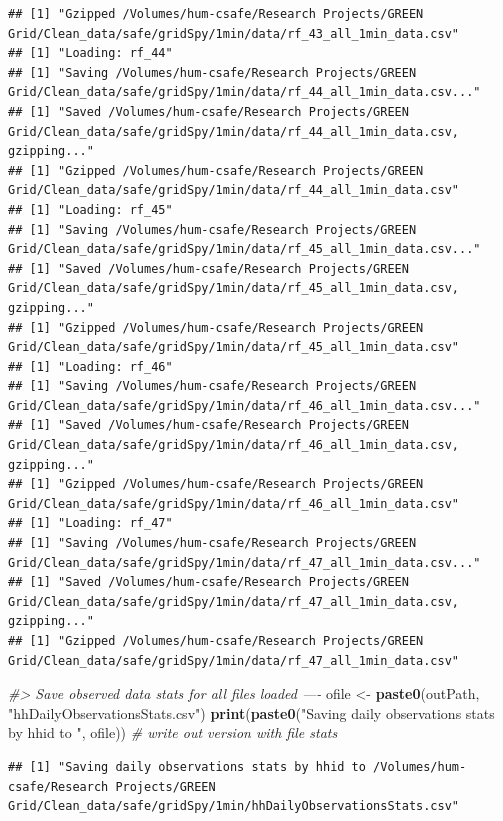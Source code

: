 \documentclass[]{article}
\newenvironment{Shaded}{\begin{snugshade}}{\end{snugshade}}
\newcommand{\KeywordTok}[1]{\textcolor[rgb]{0.13,0.29,0.53}{\textbf{#1}}}
\newcommand{\StringTok}[1]{\textcolor[rgb]{0.31,0.60,0.02}{#1}}
\newcommand{\CommentTok}[1]{\textcolor[rgb]{0.56,0.35,0.01}{\textit{#1}}}
\newcommand{\NormalTok}[1]{#1}
\begin{document}
\begin{verbatim}
## [1] "Gzipped /Volumes/hum-csafe/Research Projects/GREEN Grid/Clean_data/safe/gridSpy/1min/data/rf_43_all_1min_data.csv"
## [1] "Loading: rf_44"
## [1] "Saving /Volumes/hum-csafe/Research Projects/GREEN Grid/Clean_data/safe/gridSpy/1min/data/rf_44_all_1min_data.csv..."
## [1] "Saved /Volumes/hum-csafe/Research Projects/GREEN Grid/Clean_data/safe/gridSpy/1min/data/rf_44_all_1min_data.csv, gzipping..."
## [1] "Gzipped /Volumes/hum-csafe/Research Projects/GREEN Grid/Clean_data/safe/gridSpy/1min/data/rf_44_all_1min_data.csv"
## [1] "Loading: rf_45"
## [1] "Saving /Volumes/hum-csafe/Research Projects/GREEN Grid/Clean_data/safe/gridSpy/1min/data/rf_45_all_1min_data.csv..."
## [1] "Saved /Volumes/hum-csafe/Research Projects/GREEN Grid/Clean_data/safe/gridSpy/1min/data/rf_45_all_1min_data.csv, gzipping..."
## [1] "Gzipped /Volumes/hum-csafe/Research Projects/GREEN Grid/Clean_data/safe/gridSpy/1min/data/rf_45_all_1min_data.csv"
## [1] "Loading: rf_46"
## [1] "Saving /Volumes/hum-csafe/Research Projects/GREEN Grid/Clean_data/safe/gridSpy/1min/data/rf_46_all_1min_data.csv..."
## [1] "Saved /Volumes/hum-csafe/Research Projects/GREEN Grid/Clean_data/safe/gridSpy/1min/data/rf_46_all_1min_data.csv, gzipping..."
## [1] "Gzipped /Volumes/hum-csafe/Research Projects/GREEN Grid/Clean_data/safe/gridSpy/1min/data/rf_46_all_1min_data.csv"
## [1] "Loading: rf_47"
## [1] "Saving /Volumes/hum-csafe/Research Projects/GREEN Grid/Clean_data/safe/gridSpy/1min/data/rf_47_all_1min_data.csv..."
## [1] "Saved /Volumes/hum-csafe/Research Projects/GREEN Grid/Clean_data/safe/gridSpy/1min/data/rf_47_all_1min_data.csv, gzipping..."
## [1] "Gzipped /Volumes/hum-csafe/Research Projects/GREEN Grid/Clean_data/safe/gridSpy/1min/data/rf_47_all_1min_data.csv"
\end{verbatim}

\begin{Shaded}
\begin{Highlighting}[]
\CommentTok{#> Save observed data stats for all files loaded ----}
\NormalTok{ofile <-}\StringTok{ }\KeywordTok{paste0}\NormalTok{(outPath, }\StringTok{"hhDailyObservationsStats.csv"}\NormalTok{)}
\KeywordTok{print}\NormalTok{(}\KeywordTok{paste0}\NormalTok{(}\StringTok{"Saving daily observations stats by hhid to "}\NormalTok{, ofile)) }\CommentTok{# write out version with file stats}
\end{Highlighting}
\end{Shaded}

\begin{verbatim}
## [1] "Saving daily observations stats by hhid to /Volumes/hum-csafe/Research Projects/GREEN Grid/Clean_data/safe/gridSpy/1min/hhDailyObservationsStats.csv"
\end{verbatim}
\end{document}
